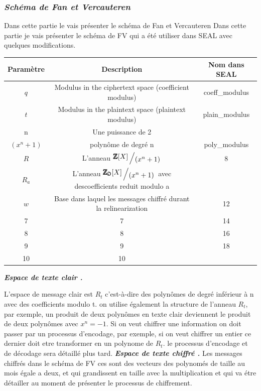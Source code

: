 \documentclass[a4paper,11pt]{report}
\begin{document}
\subsubsection*{\textit{Schéma de  Fan et Vercauteren}}
Dans cette partie le vais présenter le schéma de Fan et Vercauteren\newline
Dans cette partie je vais présenter le schéma de FV qui a été utiliser dans SEAL avec quelques modifications.\newline
\newline
\vspace{100\baselineskip}
\newcommand{\bigslant}[2]{{\raisebox{.2em}{$#1$}\left/\raisebox{-.2em}{$#2$}\right.}}
\begin{tabular}{|c|c|c|}

\hline
 Paramètre& Description & Nom dans SEAL \\
\hline
$q$ & Modulus in the ciphertext space (coefficient modulus) & coeff\_modulus  \\
\hline
$t$ & Modulus in the plaintext space (plaintext modulus) & plain\_modulus \\
\hline
n & Une puissance de 2 &   \\
\hline
$(x^{n}+1)$ & polynôme de degré n  & poly\_modulus  \\
\hline
$R$ & L'anneau $\bigslant{\pmb{\mathbb{Z}}[X]}{(x^{n}+1)}$ & 8  \\
\hline
$R_a$ & L'anneau $\bigslant{\pmb{\mathbb{Z_a}}[X]}{(x^{n}+1)}$ avec descoefficients reduit modulo a &  \\
\hline
$w$ & Base dans laquel les messages chiffré durant la relinearization & 12 \\
\hline
7 & 7 & 14 \\
\hline
8 & 8 & 16 \\
\hline
9 & 9 & 18 \\
\hline
10 & 10 & \\
\hline

\end{tabular}
\newline
\textbf{\textit{ Espace de texte clair .}}\newline

L'espace de message clair est $R_t$ c'est-à-dire des polynômes de degré inférieur à n avec des coefficients modulo t. on utilise également la structure de l'anneau $R_t$, par exemple, un produit de deux polynômes en texte clair deviennent le produit de deux polynômes avec $x^n = -1$.\newline
Si on veut chiffrer une information on doit passer par un processus d'encodage, par exemple, si on veut chiffrer un entier ce dernier doit etre transformer en un polynome de $R_t$. le processus d'encodage et de décodage sera détaillé plus tard.\newline 
\textbf{\textit{ Espace de texte chiffré .}}\newline
Les messages chiffrés dans le schéma de FV ces sont des vecteurs  des polynomés de taille au mois égale a deux, et qui grandissent en taille avec la multiplication et qui va étre détailler au moment de présenter le processus de chiffrement. 
\end{document}
